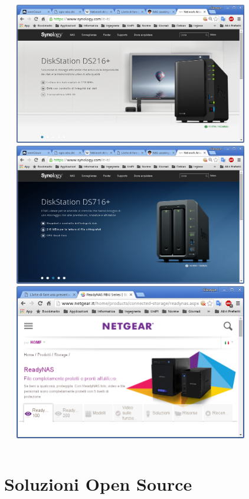 \documentclass[11pt,xcolor=table]{beamer}
\begin{document}
\begin{frame}
\begin{columns}
\begin{column}{0.48\textwidth}
		\end{column}
		\begin{column}{0.48\textwidth}
			\centering
			\includegraphics[width=0.8\textwidth]{NasComm/NAS3.png}
			\vspace{1mm}
			\includegraphics[width=0.8\textwidth]{NasComm/NAS4.png}
			\vspace{1mm}
			\includegraphics[width=0.8\textwidth]{NasComm/NAS6.png}
		\end{column}
	\end{columns}
\end{frame}

\section{Soluzioni Open Source}
\end{document}

